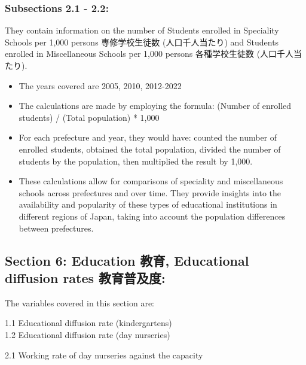 \documentclass[
]{ltjarticle}
\begin{document}
\hypertarget{subsections-2.1---2.2-1}{%
\subsubsection{Subsections 2.1 - 2.2:}\label{subsections-2.1---2.2-1}}

They contain information on the number of Students enrolled in
Speciality Schools per 1,000 persons 専修学校生徒数 (人口千人当たり) and
Students enrolled in Miscellaneous Schools per 1,000 persons
各種学校生徒数 (人口千人当たり).

\begin{itemize}
\item
  The years covered are 2005, 2010, 2012-2022
\item
  The calculations are made by employing the formula: (Number of
  enrolled students) / (Total population) * 1,000
\item
  For each prefecture and year, they would have: counted the number of
  enrolled students, obtained the total population, divided the number
  of students by the population, then multiplied the result by 1,000.
\item
  These calculations allow for comparisons of speciality and
  miscellaneous schools across prefectures and over time. They provide
  insights into the availability and popularity of these types of
  educational institutions in different regions of Japan, taking into
  account the population differences between prefectures.
\end{itemize}

\hypertarget{section-6-education-ux6559ux80b2-educational-diffusion-rates-ux6559ux80b2ux666eux53caux5ea6}{%
\subsection{Section 6: Education 教育, Educational diffusion rates
教育普及度:}\label{section-6-education-ux6559ux80b2-educational-diffusion-rates-ux6559ux80b2ux666eux53caux5ea6}}

The variables covered in this section are:

1.1 Educational diffusion rate (kindergartens)\\
1.2 Educational diffusion rate (day nurseries)

2.1 Working rate of day nurseries against the capacity
\end{document}
